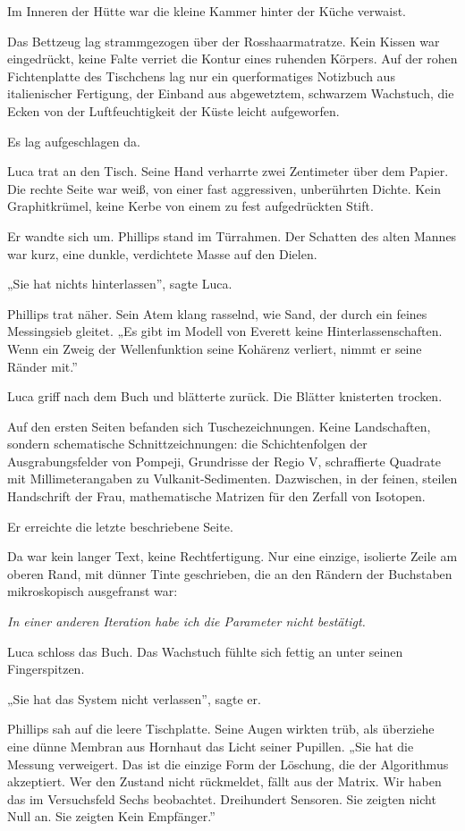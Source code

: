 \documentclass[
  ngerman,
]{article}
\begin{document}
Im Inneren der Hütte war die kleine Kammer hinter der Küche verwaist.

Das Bettzeug lag strammgezogen über der Rosshaarmatratze. Kein Kissen
war eingedrückt, keine Falte verriet die Kontur eines ruhenden Körpers.
Auf der rohen Fichtenplatte des Tischchens lag nur ein querformatiges
Notizbuch aus italienischer Fertigung, der Einband aus abgewetztem,
schwarzem Wachstuch, die Ecken von der Luftfeuchtigkeit der Küste leicht
aufgeworfen.

Es lag aufgeschlagen da.

Luca trat an den Tisch. Seine Hand verharrte zwei Zentimeter über dem
Papier. Die rechte Seite war weiß, von einer fast aggressiven,
unberührten Dichte. Kein Graphitkrümel, keine Kerbe von einem zu fest
aufgedrückten Stift.

Er wandte sich um. Phillips stand im Türrahmen. Der Schatten des alten
Mannes war kurz, eine dunkle, verdichtete Masse auf den Dielen.

„Sie hat nichts hinterlassen'', sagte Luca.

Phillips trat näher. Sein Atem klang rasselnd, wie Sand, der durch ein
feines Messingsieb gleitet. „Es gibt im Modell von Everett keine
Hinterlassenschaften. Wenn ein Zweig der Wellenfunktion seine Kohärenz
verliert, nimmt er seine Ränder mit.''

Luca griff nach dem Buch und blätterte zurück. Die Blätter knisterten
trocken.

Auf den ersten Seiten befanden sich Tuschezeichnungen. Keine
Landschaften, sondern schematische Schnittzeichnungen: die
Schichtenfolgen der Ausgrabungsfelder von Pompeji, Grundrisse der Regio
V, schraffierte Quadrate mit Millimeterangaben zu Vulkanit-Sedimenten.
Dazwischen, in der feinen, steilen Handschrift der Frau, mathematische
Matrizen für den Zerfall von Isotopen.

Er erreichte die letzte beschriebene Seite.

Da war kein langer Text, keine Rechtfertigung. Nur eine einzige,
isolierte Zeile am oberen Rand, mit dünner Tinte geschrieben, die an den
Rändern der Buchstaben mikroskopisch ausgefranst war:

\emph{In einer anderen Iteration habe ich die Parameter nicht
bestätigt.}

Luca schloss das Buch. Das Wachstuch fühlte sich fettig an unter seinen
Fingerspitzen.

„Sie hat das System nicht verlassen'', sagte er.

Phillips sah auf die leere Tischplatte. Seine Augen wirkten trüb, als
überziehe eine dünne Membran aus Hornhaut das Licht seiner Pupillen.
„Sie hat die Messung verweigert. Das ist die einzige Form der Löschung,
die der Algorithmus akzeptiert. Wer den Zustand nicht rückmeldet, fällt
aus der Matrix. Wir haben das im Versuchsfeld Sechs beobachtet.
Dreihundert Sensoren. Sie zeigten nicht
\textquotesingle Null\textquotesingle{} an. Sie zeigten
\textquotesingle Kein Empfänger\textquotesingle.''
\end{document}
